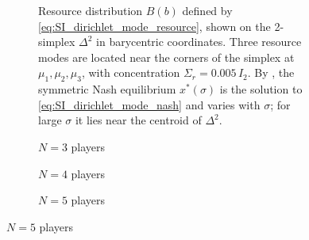 \documentclass{article}
\begin{document}
        \begin{figure}[ht!]
            \centering
            \begin{subfigure}[b]{0.6\linewidth}
                \centering
                
                \caption{Resource distribution $B(b)$ defined by \cref{eq:SI_dirichlet_mode_resource}, shown on the 2-simplex $\Delta^2$ in barycentric coordinates.
                    Three resource modes are located near the corners of the simplex at $\mu_1,\mu_2,\mu_3$, with concentration $\Sigma_r = 0.005\,I_2$. By , the symmetric Nash equilibrium $x^*(\sigma)$ is the solution to \cref{eq:SI_dirichlet_mode_nash} and varies with $\sigma$; for large $\sigma$ it lies near the centroid of $\Delta^2$.}
                \label{fig:simplex_dirl_bifurcation:a}
            \end{subfigure}

            \begin{subfigure}[b]{0.3\linewidth}
                \centering
                
                \caption{$N = 3$ players}
                \label{fig:simplex_dirl_bifurcation:b}
                \vspace{4ex}
            \end{subfigure}
            \begin{subfigure}[b]{0.3\linewidth}
                \centering
                
                \caption{$N = 4$ players}
                \label{fig:simplex_dirl_bifurcation:c}
                \vspace{4ex}
            \end{subfigure}
            \begin{subfigure}[b]{0.3\linewidth}
                \centering
                
                \caption{$N = 5$ players}
                \label{fig:simplex_dirl_bifurcation:d}
                \vspace{4ex}
            \end{subfigure}


\end{figure}
\end{document}
